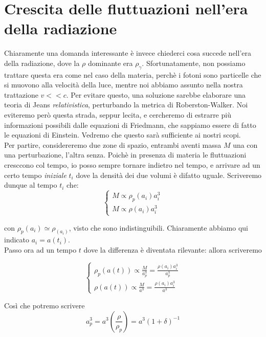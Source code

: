 \documentclass{report}
\begin{document}
\section{Crescita delle fluttuazioni nell'era della radiazione}

Chiaramente una domanda interessante è invece chiederci cosa succede nell'era della radiazione, dove la $\rho$ dominante era $\rho_\gamma$. Sfortunatamente, non possiamo trattare questa era come nel caso della materia, perchè i fotoni sono particelle che si muovono alla velocità della luce, mentre noi abbiamo assunto nella nostra trattazione $v << c$. Per evitare questo, una soluzione sarebbe elaborare una teoria di Jeans \emph{relativistica}, perturbando la metrica di Roberston-Walker. Noi eviteremo però questa strada, seppur lecita, e cercheremo di estrarre più informazioni possibili dalle equazioni di Friedmann, che sappiamo essere di fatto le equazioni di Einstein. Vedremo che questo sarà sufficiente ai nostri scopi. \\

Per partire, considereremo due zone di spazio, entrambi aventi massa $M$ una con una perturbazione, l'altra senza. Poichè in presenza di materia le fluttuazioni cresccono col tempo, io posso sempre tornare indietro nel tempo, e arrivare ad un certo tempo \emph{iniziale} $t_i$ dove la densità dei due volumi è difatto uguale. Scriveremo dunque al tempo $t_i$ che: 
\[\begin{cases}
    M \propto \rho_p(a_i)a_i^{3} \\ M \propto \rho(a_i)a_i^{3}
\end{cases}\]

con $\rho_p(a_i) \simeq \rho_(a_i)$, visto che sono indistinguibili. Chiaramente abbiamo qui indicato $a_i = a(t_i)$. \\

Passo ora ad un tempo $t$ dove la differenza è diventata rilevante: allora scriveremo

\[\begin{cases}
    \rho_p(a(t)) \propto \frac{M}{a_p^3} = \frac{\rho(a_i)a_i^3}{a_p^3} \\
    \rho(a(t)) \propto \frac{M}{a^3} = \frac{\rho(a_i)a_i^3}{a^3}
\end{cases}\]

Così che potremo scrivere 
\begin{equation}
    a_p^3 = a^3 \left(\frac{\rho}{\rho_p}\right) = a^3 (1+\delta)^{-1}
\end{equation}
\end{document}
